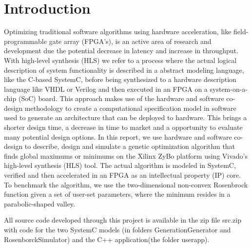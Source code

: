 \section{Introduction}
Optimizing traditional software algorithms using hardware acceleration, like field-programmable gate array (FPGA's), is an active area of research and development due the potential decrease in latency and increase in throughput. With high-level synthesis (HLS) we refer to a process where the actual logical description of system functionality is described in a abstract modeling language, like the C-based SystemC, before being synthesized to a hardware description language like VHDL or Verilog and then executed in an FPGA on a system-on-a-chip (SoC) board. This approach makes use of the hardware and software co-design methodology to create a computational specification model in software used to generate an architecture that can be deployed to hardware. This brings a shorter design time, a decrease in time to market and a opportunity to evaluate many potential design options. In this report, we use hardware and software co-design to describe, design and simulate a genetic optimization algorithm that finds global maximums or minimums on the Xilinx ZyBo platform using Vivado's high-level synthesis (HLS) tool. The actual algorithm is modeled in SystemC, verified and then accelerated in an FPGA as an intellectual property (IP) core. To benchmark the algorithm, we use the two-dimensional non-convex Rosenbrock function\cite{Shang2006} given a set of user-set parameters, where the minimum resides in a parabolic-shaped valley.

All source code developed through this project is available in the zip file src.zip with code for the two SystemC models (in folders GenerationGenerator and RosenborckSimulator) and the C++ application(the folder userapp).